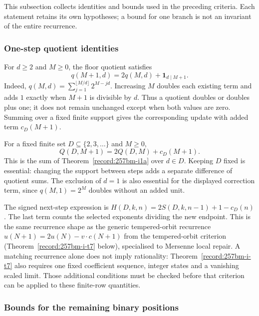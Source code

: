 This subsection collects identities and bounds used in the preceding
criteria.  Each statement retains its own hypotheses; a bound for one
branch is not an invariant of the entire recurrence.

\subsubsection*{One-step quotient identities}

\begin{thm}\label{record:257bm-i1a}
For $d\ge2$ and $M\ge0$, the floor quotient satisfies
\[
 q(M+1,d)=2q(M,d)+\mathbf1_{d\mid M+1}.
\]
Indeed, $q(M,d)=\sum_{j=1}^{\lfloor M/d\rfloor}2^{M-jd}$.
Increasing $M$ doubles each existing term and adds $1$ exactly when
$M+1$ is divisible by $d$.  Thus a quotient doubles or doubles plus
one; it does not remain unchanged except when both values are zero.
Summing over a fixed finite support gives the corresponding update
with added term $c_D(M+1)$.
\end{thm}

\begin{thm}\label{record:257bm-i1b}
For a fixed finite set $D\subseteq\{2,3,\ldots\}$ and $M\ge0$,
\[
 Q(D,M+1)=2Q(D,M)+c_D(M+1).
\]
This is the sum of Theorem~\ref{record:257bm-i1a} over $d\in D$.
Keeping $D$ fixed is essential: changing the support between steps
adds a separate difference of quotient sums.  The exclusion of
$d=1$ is also essential for the displayed correction term, since
$q(M,1)=2^M$ doubles without an added unit.
\end{thm}

\begin{thm}\label{record:257bm-i1c}
The signed next-step expression is
$H(D,k,n)=2S(D,k,n-1)+1-c_D(n)$.  The last term counts the selected
exponents dividing the new endpoint. This is the same recurrence shape as the
generic tempered-orbit recurrence $u(N+1)=2u(N)-v\cdot c(N+1)$ from the
tempered-orbit criterion (Theorem~\ref{record:257bm-i-t7} below), specialised to Mersenne
local repair. A matching recurrence alone does not imply rationality:
Theorem~\ref{record:257bm-i-t7} also requires one fixed coefficient
sequence, integer states and a vanishing scaled limit.  Those additional
conditions must be checked before that criterion can be applied to these
finite-row quantities.
\end{thm}

\subsubsection*{Bounds for the remaining binary positions}

